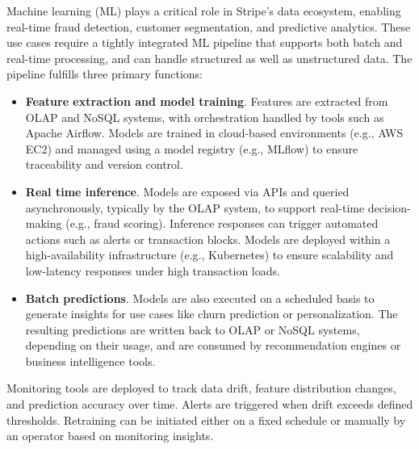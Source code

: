 \documentclass[11pt,a4paper,computermodern]{article}
\begin{document}
Machine learning (ML) plays a critical role in Stripe’s data ecosystem, enabling real-time fraud detection, customer segmentation, and predictive analytics. These use cases require a tightly integrated ML pipeline that supports both batch and real-time processing, and can handle structured as well as unstructured data. The pipeline fulfills three primary functions:
\begin{itemize}
	\item \textbf{Feature extraction and model training}. Features are extracted from OLAP and NoSQL systems, with orchestration handled by tools such as Apache Airflow. Models are trained in cloud-based environments (e.g., AWS EC2) and managed using a model registry (e.g., MLflow) to ensure traceability and version control.
	\item \textbf{Real time inference}. Models are exposed via APIs and queried asynchronously, typically by the OLAP system, to support real-time decision-making (e.g., fraud scoring). Inference responses can trigger automated actions such as alerts or transaction blocks. Models are deployed within a high-availability infrastructure (e.g., Kubernetes) to ensure scalability and low-latency responses under high transaction loads.
	\item \textbf{Batch predictions}. Models are also executed on a scheduled basis to generate insights for use cases like churn prediction or personalization. The resulting predictions are written back to OLAP or NoSQL systems, depending on their usage, and are consumed by recommendation engines or business intelligence tools.
\end{itemize}

Monitoring tools are deployed to track data drift, feature distribution changes, and prediction accuracy over time. Alerts are triggered when drift exceeds defined thresholds. Retraining can be initiated either on a fixed schedule or manually by an operator based on monitoring insights.
\end{document}
